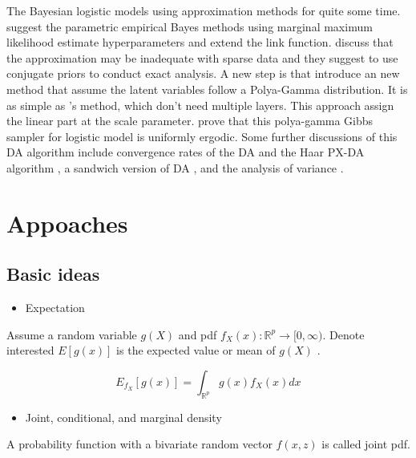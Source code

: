 \documentclass[12pt]{article}
\providecommand{\tightlist}{%
  \setlength{\itemsep}{0pt}\setlength{\parskip}{0pt}}
\begin{document}
The Bayesian logistic models using approximation methods for quite some
time. \citet{piegorschEmpiricalBayesEstimation1996} suggest the
parametric empirical Bayes methods using marginal maximum likelihood
estimate hyperparameters and extend the link function.
\citet{greenlandPuttingBackgroundInformation2001} discuss that the
approximation may be inadequate with sparse data and they suggest to use
conjugate priors to conduct exact analysis. A new step is that
\citet{polsonBayesianInferenceLogistic2013} introduce an new method that
assume the latent variables follow a Polya-Gamma distribution. It is as
simple as \citet{albertBayesianAnalysisBinary1993} 's method, which
don't need multiple layers. This approach assign the linear part at the
scale parameter. \citet{choiPolyaGammaGibbsSampler2013} prove that this
polya-gamma Gibbs sampler for logistic model is uniformly ergodic. Some
further discussions of this DA algorithm include convergence rates of
the DA and the Haar PX-DA algorithm
\citep{choiConvergenceAnalysisGibbs2014}, a sandwich version of DA
\citep{choiComparisonTheoremData2016}, and the analysis of variance
\citep{choiAnalysisPolyaGammaGibbs2017}.

\hypertarget{appoaches}{%
\section{Appoaches}\label{appoaches}}

\subsection{Basic ideas}
\label{sec:basic}

\begin{itemize}
\tightlist
\item
  Expectation
\end{itemize}

Assume a random variable \(g(X)\) and pdf
\(f_{X}(x):\mathbb{R}^{p} \to [0,\infty)\). Denote interested
\(E[g(x)]\) is the expected value or mean of \(g(X)\)
\citep[\emph{Def2.2.1}]{casellaStatisticalInference2002}.

\[E_{f_{X}}[g(x)]= \int_{\mathbb{R}^{p}} g(x) f_{X}(x) dx\]

\begin{itemize}
\tightlist
\item
  Joint, conditional, and marginal density
\end{itemize}

A probability function with a bivariate random vector \(f(x,z)\) is
called joint pdf.
\end{document}
